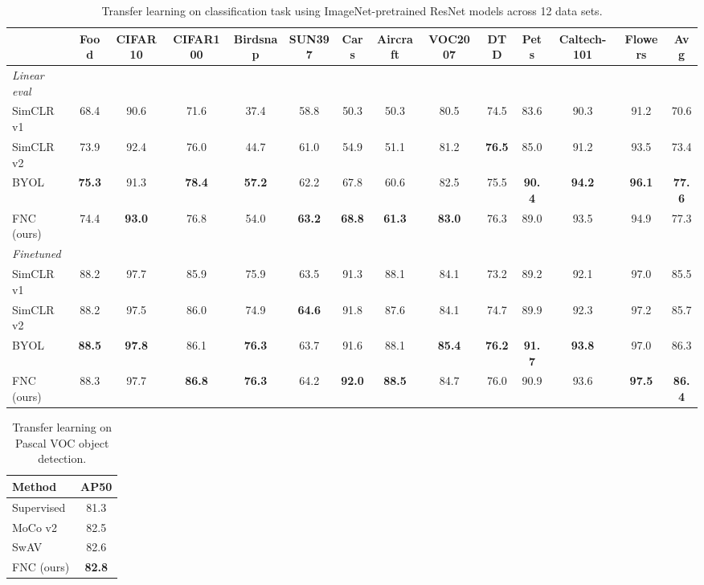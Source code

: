 \documentclass[10pt,twocolumn,letterpaper]{article}
\begin{document}
\begin{table*}[!t]
\centering
\setlength{\tabcolsep}{4.5pt}
{\footnotesize
\begin{tabularx}{\linewidth}{lccccccccccccc}
\toprule
& Food & CIFAR10 & CIFAR100 & Birdsnap & SUN397 & Cars & Aircraft & VOC2007 & DTD & Pets & Caltech-101 & Flowers & Avg\\
\midrule
\textit{Linear eval}\\ SimCLR v1~\cite{chen2020simple}& 68.4 & 90.6 & 71.6 & 37.4 & 58.8 & 50.3 & 50.3 & 80.5 & 74.5 & 83.6 & 90.3 & 91.2 & 70.6\\
SimCLR v2~\cite{chen2020big}& 73.9 & 92.4 & 76.0 & 44.7 & 61.0 & 54.9 & 51.1 &81.2 &	\textbf{76.5} & 85.0 & 91.2 & 93.5 & 73.4\\
BYOL~\cite{grill2020bootstrap} & \textbf{75.3} & 91.3 & \textbf{78.4} & \textbf{57.2} & 62.2 & 67.8 & 60.6 & 82.5 & 75.5 & \textbf{90.4} & \textbf{94.2} & \textbf{96.1} & \textbf{77.6}\\
FNC (ours) & 74.4 & \textbf{93.0} & 76.8 & 54.0 & \textbf{63.2} & \textbf{68.8} & \textbf{61.3} & \textbf{83.0} & 76.3 & 89.0 & 93.5 & 94.9 & 77.3\\
\hline
\textit{Finetuned}\\
SimCLR v1~\cite{chen2020simple} & 88.2 &	97.7 & 85.9 &	75.9 & 63.5 & 91.3 & 88.1 & 84.1 & 73.2 & 89.2 & 92.1 & 97.0 & 85.5\\
SimCLR v2~\cite{chen2020big} & 88.2 &	97.5 & 86.0 &	74.9 &	\textbf{64.6} & 91.8 & 87.6 & 84.1 & 74.7 & 89.9 & 92.3 & 97.2 & 85.7\\
BYOL~\cite{grill2020bootstrap} & \textbf{88.5} & \textbf{97.8} & 86.1 & \textbf{76.3} & 63.7 & 91.6 & 88.1 & \textbf{85.4} & \textbf{76.2} & \textbf{91.7} & \textbf{93.8} & 97.0 & 86.3\\
FNC (ours) & 88.3 & 97.7 & \textbf{86.8} & \textbf{76.3} & 64.2 & \textbf{92.0} & \textbf{88.5} & 84.7 & 76.0 & 90.9 & 93.6 & \textbf{97.5} & \textbf{86.4}\\
\bottomrule
\end{tabularx}}
\vspace{5pt}
\caption{Transfer learning on classification task using ImageNet-pretrained ResNet models across 12 data sets.}
\label{tab:transfer_learning_class}
\end{table*}
\begin{table}
\centering
\begin{tabularx}{0.7\linewidth}{Xc}
\toprule
Method & AP50 \\ \midrule
Supervised & 81.3 \\\hline
MoCo v2~\cite{chen2020mocov2} & 82.5 \\SwAV~\cite{caron2020unsupervised} & 82.6 \\FNC (ours) & \textbf{82.8}  \\\bottomrule
\end{tabularx}
\vspace{7pt}
\caption{Transfer learning on Pascal VOC object detection.}
\label{tab:transfer_learning_det_seg}
\end{table}
\end{document}
